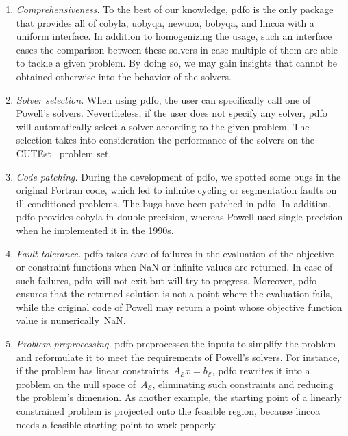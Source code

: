 \documentclass[
    smallextended,  %
    final,        %
]{svjour3}
\newcommand{\aeq}{A_{\scriptscriptstyle\mathcal{E}}}
\newcommand{\beq}{b_{\scriptscriptstyle\mathcal{E}}}
\begin{document}
\begin{enumerate}
    \item \emph{Comprehensiveness.}
    To the best of our knowledge, \gls{pdfo} is the only package that provides all of \gls{cobyla}, \gls{uobyqa}, \gls{newuoa}, \gls{bobyqa}, and \gls{lincoa} with a uniform interface.
    In addition to homogenizing the usage, such an interface eases the comparison between these solvers in case multiple of them are able to tackle a given problem.
    By doing so, we may gain insights that cannot be obtained otherwise into the behavior of the solvers.

    \item \emph{Solver selection.}
    When using \gls{pdfo}, the user can specifically call one of Powell's solvers. Nevertheless, if the user does not specify any solver, \gls{pdfo} will automatically select a solver according to the given problem.
    The selection takes into consideration the performance of the solvers on the CUTEst~\cite{Gould_Orban_Toint_2015} problem set.

    \item \emph{Code patching.}
    During the development of \gls{pdfo}, we spotted some bugs in the original Fortran code, which led to infinite cycling or segmentation faults on ill-conditioned problems.
    The bugs have been patched in \gls{pdfo}.
    In addition, \gls{pdfo} provides \gls{cobyla} in double precision, whereas Powell used single precision when he implemented it in the 1990s.

    \item \emph{Fault tolerance.}
    \Gls{pdfo} takes care of failures in the evaluation of the objective or constraint functions when NaN or infinite values are returned.
    In case of such failures, \gls{pdfo} will not exit but will try to progress.
    Moreover, \gls{pdfo} ensures that the returned solution is not a point where the evaluation fails, while the original code of Powell may return a point whose objective function value is
    numerically~NaN.

    \item \emph{Problem preprocessing.}
    \Gls{pdfo} preprocesses the inputs to simplify the problem and reformulate it to meet the requirements of Powell's solvers.
    For instance, if the problem has linear constraints~$\aeq x = \beq$, \gls{pdfo} rewrites it into a problem on the null space of~$\aeq$, eliminating such constraints and reducing the problem's dimension.
    As another example, the starting point of a linearly constrained problem is projected onto the feasible region, because \gls{lincoa} needs a feasible starting point to work properly.


\end{enumerate}
\end{document}
